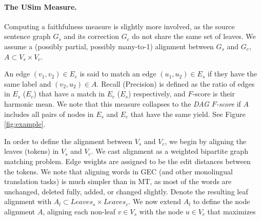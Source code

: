 \documentclass[a4paper, 11pt]{article}
\begin{document}
\paragraph{The {\sc USim} Measure.} Computing a faithfulness
measure is slightly more involved, as the source sentence graph $G_s$ and its
correction $G_c$ do not share the same set of leaves.
%
%
We assume a (possibly partial, possibly many-to-1) alignment between $G_s$ and $G_c$,
$A \subset V_s \times V_c$. 

An edge $(v_1,v_2) \in E_c$ is said to match an edge
$(u_1,u_2) \in E_s$ if they have the same label and $(v_2,u_2) \in A$. Recall (Precision)
is defined as the ratio of edges in $E_s$ ($E_c$) that have a match in $E_c$ ($E_s$) respectively, and
$F$-score is their harmonic mean. We note that this measure collapses to the
{\it DAG $F$-score} if $A$ includes all pairs of nodes in $E_s$ and $E_c$ that have
the same yield. See Figure \ref{fig:example}. 

In order to define the alignment between $V_s$ and $V_c$, we begin by aligning the leaves
(tokens) in $V_s$ and $V_c$.
We cast alignment as a weighted bipartite graph matching problem. Edge weights are assigned to be the edit distances between the tokens.
We note that aligning words in GEC (and other monolingual translation tasks) is much simpler than in MT,
as most of the words are unchanged, deleted fully, added, or changed slightly.
Denote the resulting leaf alignment with $A_l \subset Leaves_s \times Leaves_c$.
We now extend $A_l$ to define the node alignment $A$, aligning each non-leaf $v \in V_s$
with the node $u \in V_c$ that maximizes
\end{document}
